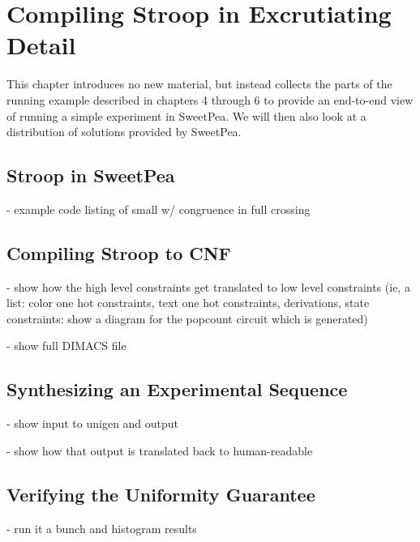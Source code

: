 \chapter{Compiling Stroop in Excrutiating Detail}

This chapter introduces no new material, but instead collects the parts of the running example described in chapters 4 through 6 to provide an end-to-end view of running a simple experiment in SweetPea. We will then also look at a distribution of solutions provided by SweetPea.

\section{Stroop in SweetPea}

- example code listing of small w/ congruence in full crossing


\section{Compiling Stroop to CNF}

- show how the high level constraints get translated to low level constraints
(ie, a list: color one hot constraints, text one hot constraints, derivations, state constraints: show a diagram for the popcount circuit which is generated)

- show full DIMACS file

\section{Synthesizing an Experimental Sequence}

- show input to unigen and output

- show how that output is translated back to human-readable


\section{Verifying the Uniformity Guarantee}

- run it a bunch and histogram results
